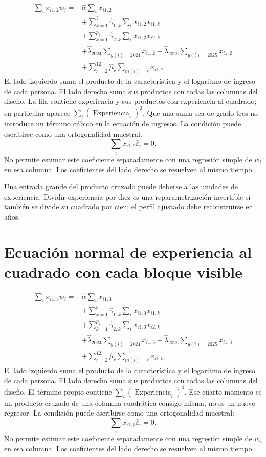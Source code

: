 \documentclass[11pt,a4paper]{article}
\begin{document}
\[
\begin{aligned}\sum_i x_{i1,2}w_i={}&\widehat\alpha\sum_ix_{i1,2}\\&+\sum_{k=1}^3\widehat\gamma_{1,k}\sum_ix_{i1,2}x_{i1,k}\\&+\sum_{k=1}^{p_2}\widehat\gamma_{2,k}\sum_ix_{i1,2}x_{i2,k}\\&+\widehat\lambda_{2024}\sum_{y(i)=2024}x_{i1,2}+\widehat\lambda_{2025}\sum_{y(i)=2025}x_{i1,2}\\&+\sum_{r=2}^{12}\widehat\mu_r\sum_{m(i)=r}x_{i1,2}.\end{aligned}
\]
El lado izquierdo suma el producto de la característica y el logaritmo de ingreso de cada persona. El lado derecho suma sus productos con todas las columnas del diseño. La fila contiene experiencia y sus productos con experiencia al cuadrado; en particular aparece $\sum_i(\operatorname{Experiencia}_i)^3$. Que una suma sea de grado tres no introduce un término cúbico en la ecuación de ingresos.
La condición puede escribirse como una ortogonalidad muestral:
\[
\sum_i x_{i1,2}\widehat\varepsilon_i=0.
\]
No permite estimar este coeficiente separadamente con una regresión simple de $w_i$ en esa columna. Los coeficientes del lado derecho se resuelven al mismo tiempo.

Una entrada grande del producto cruzado puede deberse a las unidades de experiencia. Dividir experiencia por diez es una reparametrización invertible si también se divide su cuadrado por cien; el perfil ajustado debe reconstruirse en años.

\clearpage
\section{Ecuación normal de experiencia al cuadrado con cada bloque visible}

\[
\begin{aligned}\sum_i x_{i1,3}w_i={}&\widehat\alpha\sum_ix_{i1,3}\\&+\sum_{k=1}^3\widehat\gamma_{1,k}\sum_ix_{i1,3}x_{i1,k}\\&+\sum_{k=1}^{p_2}\widehat\gamma_{2,k}\sum_ix_{i1,3}x_{i2,k}\\&+\widehat\lambda_{2024}\sum_{y(i)=2024}x_{i1,3}+\widehat\lambda_{2025}\sum_{y(i)=2025}x_{i1,3}\\&+\sum_{r=2}^{12}\widehat\mu_r\sum_{m(i)=r}x_{i1,3}.\end{aligned}
\]
El lado izquierdo suma el producto de la característica y el logaritmo de ingreso de cada persona. El lado derecho suma sus productos con todas las columnas del diseño. El término propio contiene $\sum_i(\operatorname{Experiencia}_i)^4$. Ese cuarto momento es un producto cruzado de una columna cuadrática consigo misma; no es un nuevo regresor.
La condición puede escribirse como una ortogonalidad muestral:
\[
\sum_i x_{i1,3}\widehat\varepsilon_i=0.
\]
No permite estimar este coeficiente separadamente con una regresión simple de $w_i$ en esa columna. Los coeficientes del lado derecho se resuelven al mismo tiempo.
\end{document}
